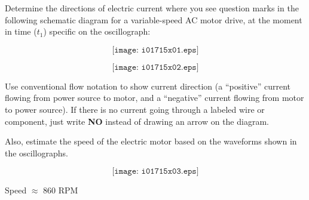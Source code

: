 

Determine the directions of electric current where you see question marks in the following schematic diagram for a variable-speed AC motor drive, at the moment in time ($t_1$) specific on the oscillograph:

$$\texttt{[image: i01715x01.eps]}$$

$$\texttt{[image: i01715x02.eps]}$$

Use conventional flow notation to show current direction (a ``positive'' current flowing from power source to motor, and a ``negative'' current flowing from motor to power source).  If there is no current going through a labeled wire or component, just write {\bf NO} instead of drawing an arrow on the diagram.

\vskip 10pt

Also, estimate the speed of the electric motor based on the waveforms shown in the oscillographs.







$$\texttt{[image: i01715x03.eps]}$$

Speed $\approx$ 860 RPM










